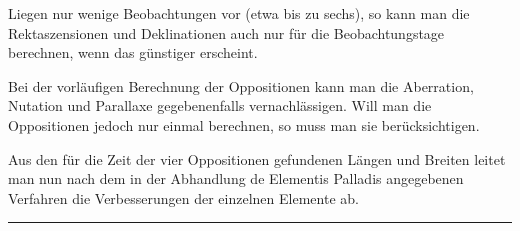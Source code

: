 Liegen nur wenige Beobachtungen vor (etwa bis zu sechs), so kann man die Rektaszensionen und Deklinationen auch nur für die Beobachtungstage berechnen, wenn das günstiger erscheint.

Bei der vorläufigen Berechnung der Oppositionen kann man die Aberration, Nutation und Parallaxe gegebenenfalls vernachlässigen. Will man die Oppositionen jedoch nur einmal berechnen, so muss man sie berücksichtigen.

Aus den für die Zeit der vier Oppositionen gefundenen Längen und Breiten leitet man nun nach dem in der Abhandlung de Elementis Palladis angegebenen Verfahren die Verbesserungen der einzelnen Elemente ab.

\par\medskip\begin{center}\rule{.22\textwidth}{.3pt}\end{center}
